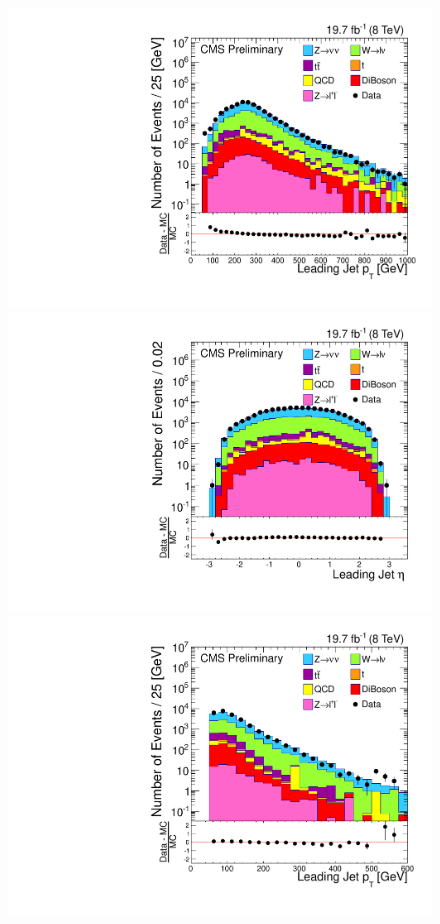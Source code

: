 \begin{figure}%
  \begin{center}
  \includegraphics[scale=0.32]     {Figures/sus13009/nocut/Jet1Pt.pdf}
  \includegraphics[scale=0.32]     {Figures/sus13009/nocut/Jet1Eta.pdf}
  \includegraphics[scale=0.32]     {Figures/sus13009/nocut/Jet2Pt.pdf}

\end{center}
\end{figure}
